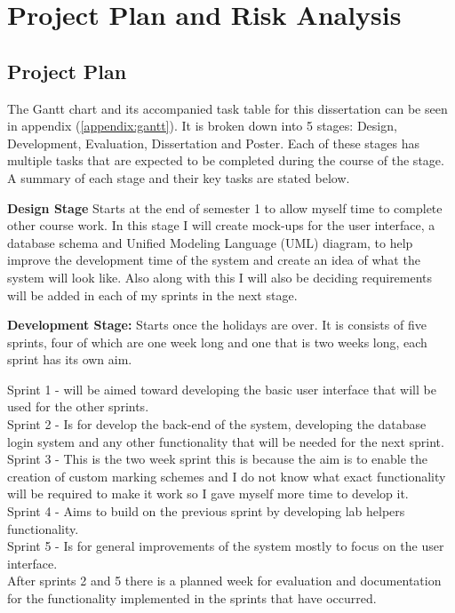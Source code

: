 \documentclass[12pt]{article}  %
\begin{document}
\newpage
\section{Project Plan and Risk Analysis}


\subsection{Project Plan}


The Gantt chart and its accompanied task table for this dissertation can be seen in appendix (\ref{appendix:gantt}). It is broken down into 5 stages: Design, Development, Evaluation, Dissertation and Poster. Each of these stages has multiple tasks that are expected to be completed during the course of the stage. A summary of each stage and their key tasks are stated below.\bigskip

\noindent
\textbf{Design Stage} Starts at the end of semester 1 to allow myself time to complete other course work. In this stage I will create mock-ups for the user interface, a database schema and Unified Modeling Language (UML) diagram, to help improve the development time of the system and create an idea of what the system will look like. Also along with this I will also be deciding requirements will be added in each of my sprints in the next stage.\bigskip

\noindent
\textbf{Development Stage:} Starts once the holidays are over. It is consists of five sprints, four of which are one week long and one that is two weeks long, each sprint has its own aim. 

\noindent Sprint 1 - will be aimed toward developing the basic user interface that will be used for the other sprints.\\ 
Sprint 2 - Is for develop the back-end of the system, developing the database login system and any other functionality that will be needed for the next sprint.\\
Sprint 3 - This is the two week sprint this is because the aim is to enable the creation of custom marking schemes and I do not know what exact functionality will be required to make it work so I gave myself more time to develop it.\\
Sprint 4 - Aims to build on the previous sprint by developing lab helpers functionality.\\ 
Sprint 5 - Is for general improvements of the system mostly to focus on the user interface.\\
After sprints 2 and 5 there is a planned week for evaluation and documentation for the functionality implemented in the sprints that have occurred.\bigskip
\end{document}
